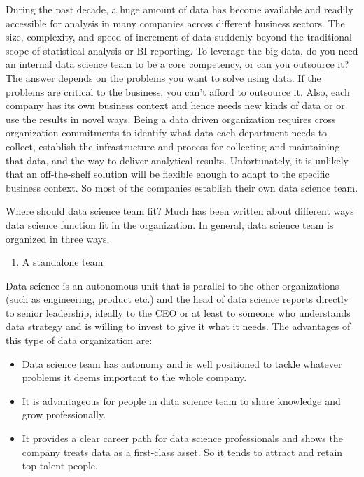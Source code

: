 \documentclass[12pt,]{krantz}
\providecommand{\tightlist}{%
  \setlength{\itemsep}{0pt}\setlength{\parskip}{0pt}}
\theoremstyle{definition}
\theoremstyle{definition}
\theoremstyle{definition}
\theoremstyle{remark}
\begin{document}
During the past decade, a huge amount of data has become available and
readily accessible for analysis in many companies across different
business sectors. The size, complexity, and speed of increment of data
suddenly beyond the traditional scope of statistical analysis or BI
reporting. To leverage the big data, do you need an internal data
science team to be a core competency, or can you outsource it? The
answer depends on the problems you want to solve using data. If the
problems are critical to the business, you can't afford to outsource it.
Also, each company has its own business context and hence needs new
kinds of data or or use the results in novel ways. Being a data driven
organization requires cross organization commitments to identify what
data each department needs to collect, establish the infrastructure and
process for collecting and maintaining that data, and the way to deliver
analytical results. Unfortunately, it is unlikely that an off-the-shelf
solution will be flexible enough to adapt to the specific business
context. So most of the companies establish their own data science team.

Where should data science team fit? Much has been written about
different ways data science function fit in the organization. In
general, data science team is organized in three ways.

\begin{enumerate}
\def\labelenumi{(\arabic{enumi})}
\tightlist
\item
  A standalone team
\end{enumerate}

Data science is an autonomous unit that is parallel to the other
organizations (such as engineering, product etc.) and the head of data
science reports directly to senior leadership, ideally to the CEO or at
least to someone who understands data strategy and is willing to invest
to give it what it needs. The advantages of this type of data
organization are:

\begin{itemize}
\tightlist
\item
  Data science team has autonomy and is well positioned to tackle
  whatever problems it deems important to the whole company.
\item
  It is advantageous for people in data science team to share knowledge
  and grow professionally.
\item
  It provides a clear career path for data science professionals and
  shows the company treats data as a first-class asset. So it tends to
  attract and retain top talent people.
\end{itemize}
\end{document}
